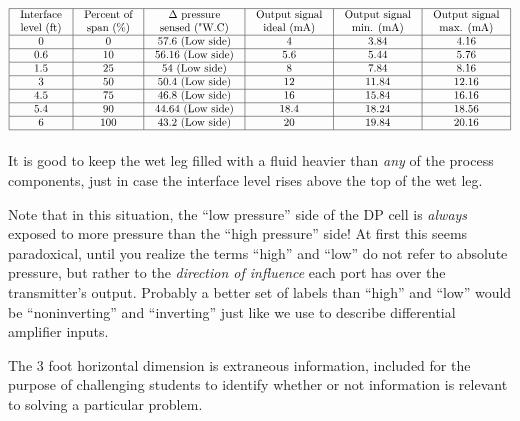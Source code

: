$$\vbox{\offinterlineskip
\halign{\strut
\vrule \quad\hfil # \ \hfil & 
\vrule \quad\hfil # \ \hfil & 
\vrule \quad\hfil # \ \hfil & 
\vrule \quad\hfil # \ \hfil & 
\vrule \quad\hfil # \ \hfil & 
\vrule \quad\hfil # \ \hfil \vrule \cr
\noalign{\hrule}
%
Interface & Percent of & $\Delta$ pressure & Output signal & Output signal & Output signal \cr
%
level (ft) & span (\%) & sensed ("W.C) & ideal (mA) & min. (mA) & max. (mA) \cr
%
\noalign{\hrule}
%
0 & 0 & 57.6 (Low side) & 4 & 3.84 & 4.16 \cr
%
\noalign{\hrule}
%
0.6 & 10 & 56.16 (Low side) & 5.6 & 5.44 & 5.76 \cr
%
\noalign{\hrule}
%
1.5 & 25 & 54 (Low side) & 8 & 7.84 & 8.16 \cr
%
\noalign{\hrule}
%
3 & 50 & 50.4 (Low side) & 12 & 11.84 & 12.16 \cr
%
\noalign{\hrule}
%
4.5  & 75 & 46.8 (Low side) & 16 & 15.84 & 16.16 \cr
%
\noalign{\hrule}
%
5.4 & 90 & 44.64 (Low side) & 18.4 & 18.24 & 18.56 \cr
%
\noalign{\hrule}
%
6 & 100 & 43.2 (Low side) & 20 & 19.84 & 20.16 \cr
%
\noalign{\hrule}
} %
}$$ %

It is good to keep the wet leg filled with a fluid heavier than {\it any} of the process components, just in case the interface level rises above the top of the wet leg.

\vskip 10pt

Note that in this situation, the ``low pressure'' side of the DP cell is {\it always} exposed to more pressure than the ``high pressure'' side!  At first this seems paradoxical, until you realize the terms ``high'' and ``low'' do not refer to absolute pressure, but rather to the {\it direction of influence} each port has over the transmitter's output.  Probably a better set of labels than ``high'' and ``low'' would be ``noninverting'' and ``inverting'' just like we use to describe differential amplifier inputs.

\vskip 10pt

The 3 foot horizontal dimension is extraneous information, included for the purpose of challenging students to identify whether or not information is relevant to solving a particular problem.




